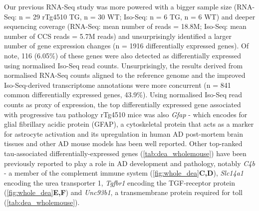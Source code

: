 Our previous RNA-Seq study\cite{Castanho2020} was more powered with a bigger sample size (RNA-Seq: n = 29 rTg4510 TG, n = 30 WT; Iso-Seq: n = 6 TG, n = 6 WT) and deeper sequencing coverage (RNA-Seq: mean number of reads = 18.8M; Iso-Seq: mean number of CCS reads = 5.7M reads) and unsurprisingly identified a larger number of gene expression changes (n = 1916 differentially expressed genes). Of note, 116 (6.05\%) of these genes were also detected as differentially expressed using normalised Iso-Seq read counts. Unsurprisingly, the results derived from normalised RNA-Seq counts aligned to the reference genome and the improved Iso-Seq-derived transcriptome annotations were more concurrent (n = 841 common differentially expressed genes, 43.9\%). Using normalised Iso-Seq read counts as proxy of expression, the top differentially expressed gene associated with progressive tau pathology rTg4510 mice was also \textit{Gfap} - which encodes for glial fibrillary acidic protein (GFAP), a cytoskeletal protein that acts as a marker for astrocyte activation and its upregulation in human AD post-mortem brain tissues and other AD mouse  models has been well reported\cite{Muramori1998,Ishiki2016, Chatterjee2021}. Other top-ranked tau-associated differentially-expressed genes (\cref{tab:dea_wholemouse}) have been previously reported to play a role in AD development and pathology, notably \textit{C4b}\cite{Zorzetto2016} - a member of the complement immune system (\cref{fig:whole_dea}\textbf{C,D}), \textit{Slc14a1}\cite{Castillo2017} encoding the urea transporter 1, \textit{Tgfbr1} encoding the TGF-\textbeta receptor protein (\cref{fig:whole_dea}\textbf{E,F}) and \textit{Unc93b1}\cite{Wirz2013}, a transmembrane protein required for toll (\cref{tab:dea_wholemouse}). 

